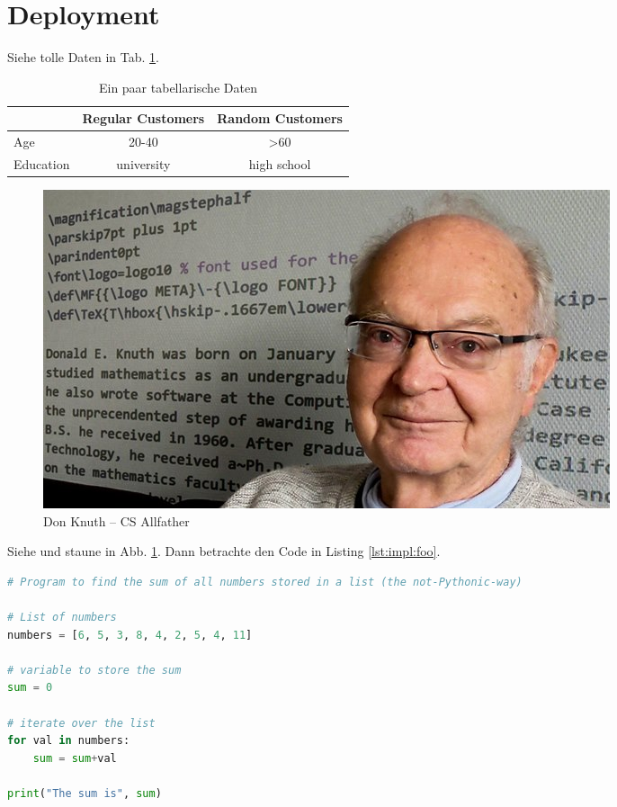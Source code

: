 \section{Deployment}
\lipsum[5-12]

Siehe tolle Daten in Tab. \ref{tab:impl:data}.

\begin{table}
    \centering
    \begin{tabular}{|lcc|}
    \hline
              & \textbf{Regular Customers} & \textbf{Random Customers} \\ \hline
    Age       & 20-40                      & \textgreater{}60          \\ \hline
    Education & university                 & high school               \\ \hline
    \end{tabular}
    \caption{Ein paar tabellarische Daten}
    \label{tab:impl:data}
\end{table}

\begin{figure}
    \centering
    \includegraphics[scale=0.5]{pics/knuthi.jpg}
    \caption{Don Knuth -- CS Allfather}
    \label{fig:impl:knuth}
\end{figure}

Siehe und staune in Abb. \ref{fig:impl:knuth}.
\lipsum[6-9]
Dann betrachte den Code in Listing \ref{lst:impl:foo}.

\begin{lstlisting}[language=Python,caption=Some code,label=lst:impl:foo]
# Program to find the sum of all numbers stored in a list (the not-Pythonic-way)

# List of numbers
numbers = [6, 5, 3, 8, 4, 2, 5, 4, 11]

# variable to store the sum
sum = 0

# iterate over the list
for val in numbers:
    sum = sum+val

print("The sum is", sum)
\end{lstlisting}